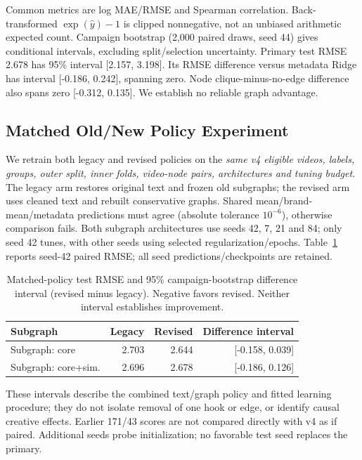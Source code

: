 \documentclass[a4paper,conference]{IEEEtran}
\begin{document}
Common metrics are log MAE/RMSE and Spearman correlation. Back-transformed $\exp(\hat y)-1$ is clipped nonnegative, not an unbiased arithmetic expected count. Campaign bootstrap (2,000 paired draws, seed 44) gives conditional intervals, excluding split/selection uncertainty. Primary test RMSE 2.678 has 95\% interval [2.157, 3.198]. Its RMSE difference versus metadata Ridge has interval [-0.186, 0.242], spanning zero. Node clique-minus-no-edge difference also spans zero [-0.312, 0.135]. We establish no reliable graph advantage.

\subsection{Matched Old/New Policy Experiment}
We retrain both legacy and revised policies on the \emph{same v4 eligible videos, labels, groups, outer split, inner folds, video-node pairs, architectures and tuning budget}. The legacy arm restores original text and frozen old subgraphs; the revised arm uses cleaned text and rebuilt conservative graphs. Shared mean/brand-mean/metadata predictions must agree (absolute tolerance $10^{-6}$), otherwise comparison fails. Both subgraph architectures use seeds 42, 7, 21 and 84; only seed 42 tunes, with other seeds using selected regularization/epochs. Table~\ref{tab:paired} reports seed-42 paired RMSE; all seed predictions/checkpoints are retained.

\begin{table}[t]\caption{Matched-policy test RMSE and 95\% campaign-bootstrap difference interval (revised minus legacy). Negative favors revised. Neither interval establishes improvement.}\label{tab:paired}\centering\scriptsize\setlength{\tabcolsep}{3pt}
\begin{tabular}{lrrr}\toprule
Subgraph & Legacy & Revised & Difference interval\\\midrule
Subgraph: core & 2.703 & 2.644 & [-0.158, 0.039] \\
Subgraph: core+sim. & 2.696 & 2.678 & [-0.186, 0.126] \\
\bottomrule\end{tabular}\end{table}

These intervals describe the combined text/graph policy and fitted learning procedure; they do not isolate removal of one hook or edge, or identify causal creative effects. Earlier 171/43 scores are not compared directly with v4 as if paired. Additional seeds probe initialization; no favorable test seed replaces the primary.
\end{document}
